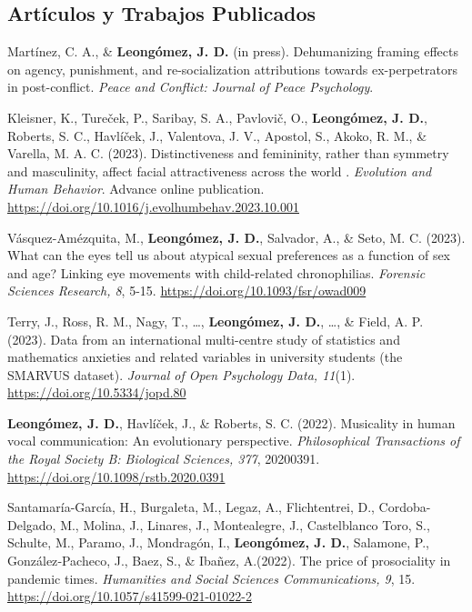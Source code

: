 \documentclass[11pt,a4paper,]{awesome-cv}
\begin{document}
\hypertarget{section}{%
\subsection{\texorpdfstring{\textbf{Artículos y Trabajos Publicados}}{}}\label{section}}

\begingroup
\footnotesize
\setlength{\parindent}{-0.5in}
\setlength{\leftskip}{0.5in}

Martínez, C. A., \& \textbf{Leongómez, J. D.} (in press). Dehumanizing
framing effects on agency, punishment, and re-socialization attributions
towards ex-perpetrators in post-conflict. \emph{Peace and Conflict:
Journal of Peace Psychology}.

Kleisner, K., Tureček, P., Saribay, S. A., Pavlovič, O.,
\textbf{Leongómez, J. D.}, Roberts, S. C., Havlíček, J., Valentova, J.
V., Apostol, S., Akoko, R. M., \& Varella, M. A. C. (2023).
Distinctiveness and femininity, rather than symmetry and masculinity,
affect facial attractiveness across the world . \emph{Evolution and
Human Behavior}. Advance online publication.
\href{https://authors.elsevier.com/c/1hyfr3tz492kal}{https://doi.org/10.1016/j.evolhumbehav.2023.10.001}

Vásquez-Amézquita, M., \textbf{Leongómez, J. D.}, Salvador, A., \& Seto,
M. C. (2023). What can the eyes tell us about atypical sexual
preferences as a function of sex and age? Linking eye movements with
child-related chronophilias. \emph{Forensic Sciences Research, 8}, 5-15.
\url{https://doi.org/10.1093/fsr/owad009}

Terry, J., Ross, R. M., Nagy, T., \ldots, \textbf{Leongómez, J. D.},
\ldots, \& Field, A. P. (2023). Data from an international multi-centre
study of statistics and mathematics anxieties and related variables in
university students (the SMARVUS dataset). \emph{Journal of Open
Psychology Data, 11}(1). \url{https://doi.org/10.5334/jopd.80}

\textbf{Leongómez, J. D.}, Havlíček, J., \& Roberts, S. C. (2022).
Musicality in human vocal communication: An evolutionary perspective.
\emph{Philosophical Transactions of the Royal Society B: Biological
Sciences, 377}, 20200391. \url{https://doi.org/10.1098/rstb.2020.0391}

Santamaría-García, H., Burgaleta, M., Legaz, A., Flichtentrei, D.,
Cordoba-Delgado, M., Molina, J., Linares, J., Montealegre, J.,
Castelblanco Toro, S., Schulte, M., Paramo, J., Mondragón, I.,
\textbf{Leongómez, J. D.}, Salamone, P., González‑Pacheco, J., Baez, S.,
\& Ibañez, A.(2022). The price of prosociality in pandemic times.
\emph{Humanities and Social Sciences Communications, 9}, 15.
\url{https://doi.org/10.1057/s41599-021-01022-2}
\end{document}
